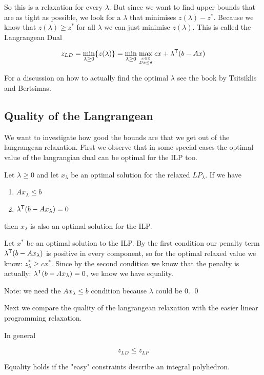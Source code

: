 So this is a relaxation for every $\lambda$. But since we want to find upper bounds that are as tight as possible, we look for a $\lambda$ that minimises $z(\lambda)-z^*$. Because we know that $z(\lambda)\geq z^*$ for all $\lambda$ we can just minimise $z(\lambda)$. This is called the Langrangean Dual

\[z_{LD} = \min_{\lambda\geq 0} \{z(\lambda)\} = \min_{\lambda\geq 0} \max_{{x\in \mathbb{Z}}\atop {Dx\leq d}} cx+{\lambda}^\text{\upshape \sffamily T}(b-Ax) \]

For a discussion on how to actually find the optimal $\lambda$ see the book by Tsitsiklis and Bertsimas.

\subsection{Quality of the Langrangean}

We want to investigate how good the bounds are that we get out of the langrangean relaxation. First we observe that in some special cases the optimal value of the langrangian dual can be optimal for the ILP too.

\begin{thm}\label{thm:relaxedOptimal} Let $\lambda \geq 0 $ and let $x_\lambda$ be an optimal solution for the relaxed $LP_\lambda$. If we have

\begin{enumerate}
\item $Ax_\lambda \leq b$
\item ${\lambda}^\text{\upshape \sffamily T}(b-Ax_\lambda) = 0$
\end{enumerate}

then $x_\lambda$ is also an optimal solution for the ILP.
\end{thm}

\begin{pr} Let $x^*$ be an optimal solution to the ILP. By the first condition our penalty term ${\lambda}^\text{\upshape \sffamily T}(b-Ax_\lambda)$ is positive in every component, so for the optimal relaxed value we know: $z_\lambda ^*\geq c x^*$. Since by the second condition we know that the penalty is actually: ${\lambda}^\text{\upshape \sffamily T}(b-Ax_\lambda) = 0$, we know we have equality.

Note: we need the $Ax_\lambda \leq b$ condition because $\lambda$ could be 0.
\qed \end{pr}

Next we compare the quality of the langrangean relaxation with the easier linear programming relaxation.

\begin{thm} In general

\[z_{LD} \leq z_{LP}\]

Equality holds if the "easy" constraints describe an integral polyhedron.
\end{thm}

